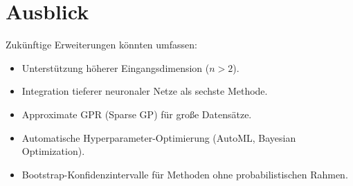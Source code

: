 \documentclass[11pt,a4paper]{report}
\begin{document}
\section{Ausblick}

Zuk\"{u}nftige Erweiterungen k\"{o}nnten umfassen:
\begin{itemize}
\item Unterst\"{u}tzung h\"{o}herer Eingangsdimension ($n > 2$).
\item Integration tieferer neuronaler Netze als sechste Methode.
\item Approximate GPR (Sparse GP) f\"{u}r gro\ss{}e Datens\"{a}tze.
\item Automatische Hyperparameter-Optimierung (AutoML, Bayesian Optimization).
\item Bootstrap-Konfidenzintervalle f\"{u}r Methoden ohne probabilistischen Rahmen.
\end{itemize}

\printbibliography[heading=bibintoc, title={Literaturverzeichnis}]
\end{document}
